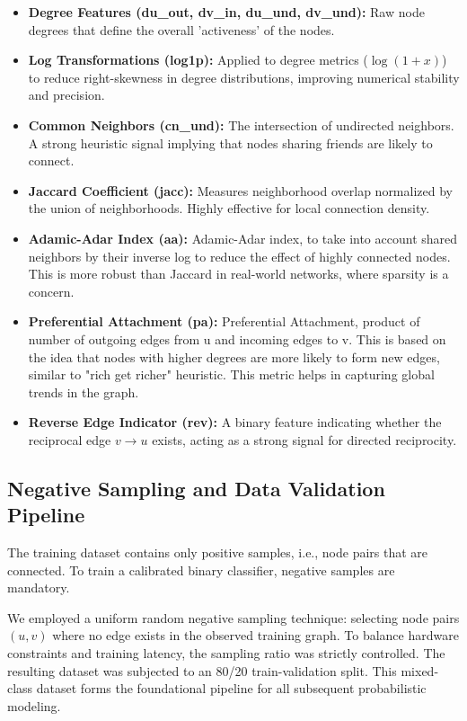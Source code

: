 \documentclass[11pt,a4paper]{article}
\begin{document}
\begin{itemize}[noitemsep]
    \item \textbf{Degree Features (du\_out, dv\_in, du\_und, dv\_und):} Raw node degrees that define the overall 'activeness' of the nodes.
    \item \textbf{Log Transformations (log1p):} Applied to degree metrics ($\log(1 + x)$) to reduce right-skewness in degree distributions, improving numerical stability and precision.
    \item \textbf{Common Neighbors (cn\_und):} The intersection of undirected neighbors. A strong heuristic signal implying that nodes sharing friends are likely to connect.
    \item \textbf{Jaccard Coefficient (jacc):} Measures neighborhood overlap normalized by the union of neighborhoods. Highly effective for local connection density.
    \item \textbf{Adamic-Adar Index (aa):} Adamic-Adar index, to take into account shared neighbors by their inverse log to reduce the effect of highly connected nodes. This is more robust than Jaccard in real-world networks, where sparsity is a concern.
    \item \textbf{Preferential Attachment (pa):} Preferential Attachment, product of number of outgoing edges from u and incoming edges to v. This is based on the idea that nodes with higher degrees are more likely to form new edges, similar to "rich get richer" heuristic. This metric helps in capturing global trends in the graph.
    \item \textbf{Reverse Edge Indicator (rev):} A binary feature indicating whether the reciprocal edge $v \to u$ exists, acting as a strong signal for directed reciprocity.
\end{itemize}

\subsection{Negative Sampling and Data Validation Pipeline}
The training dataset contains only positive samples, i.e., node pairs that are connected. To train a calibrated binary classifier, negative samples are mandatory. 

We employed a uniform random negative sampling technique: selecting node pairs $(u, v)$ where no edge exists in the observed training graph. To balance hardware constraints and training latency, the sampling ratio was strictly controlled. The resulting dataset was subjected to an 80/20 train-validation split. This mixed-class dataset forms the foundational pipeline for all subsequent probabilistic modeling.
\end{document}
